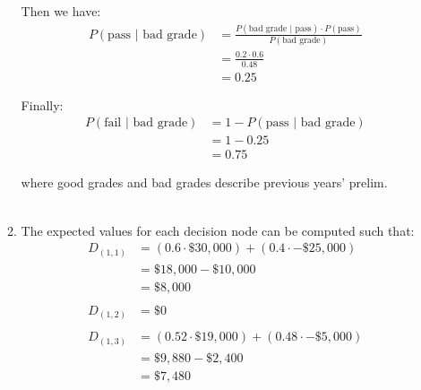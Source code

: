 \documentclass{article}
\begin{document}
\begin{enumerate}
\begin{enumerate}
        Then we have:
        \begin{equation}
            \begin{split}
              P(\text{pass $|$ bad grade}) &= \frac{P(\text{bad grade $|$ pass}) \cdot P(\text{pass})}{P(\text{bad grade})}\\
              &= \frac{0.2 \cdot 0.6}{0.48}\\
              &= 0.25
            \end{split}
        \end{equation}

        Finally:
        \begin{equation}
            \begin{split}
              P(\text{fail $|$ bad grade}) &= 1 - P(\text{pass $|$ bad grade})\\
              &= 1 - 0.25\\
              &= 0.75
            \end{split}
        \end{equation}
        
        where good grades and bad grades describe previous years' prelim.\\~\\
                
        \item The expected values for each decision node can be computed such that:
        \begin{equation}
            \begin{split}
                D_{(1,1)} &= (0.6 \cdot \$30{,}000) + (0.4 \cdot -\$25{,}000)\\
                &= \$18{,}000 - \$10{,}000\\
                &= \$8{,}000\\~\\
                D_{(1,2)} &= \$0\\~\\
                D_{(1,3)} &= (0.52 \cdot \$19{,}000) + (0.48 \cdot -\$5,000)\\
                &= \$9,880 - \$2,400\\
                &= \$7,480
            \end{split}
        \end{equation}
        

\end{enumerate}
\end{enumerate}
\end{document}
